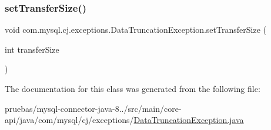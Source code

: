 \mbox{\label{classcom_1_1mysql_1_1cj_1_1exceptions_1_1_data_truncation_exception_aeef67895323c5098b53332afba588a07}} 
\subsubsection{\texorpdfstring{set\+Transfer\+Size()}{setTransferSize()}}
{\footnotesize\ttfamily void com.\+mysql.\+cj.\+exceptions.\+Data\+Truncation\+Exception.\+set\+Transfer\+Size (\begin{DoxyParamCaption}\item[{int}]{transfer\+Size }\end{DoxyParamCaption})}



The documentation for this class was generated from the following file\+:\begin{DoxyCompactItemize}
\item 
pruebas/mysql-\/connector-\/java-\/8../src/main/core-\/api/java/com/mysql/cj/exceptions/\mbox{\hyperlink{_data_truncation_exception_8java}{Data\+Truncation\+Exception.\+java}}\end{DoxyCompactItemize}
